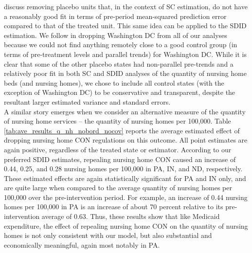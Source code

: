 \documentclass[../Main.tex]{subfiles}
\begin{document}
\indent \citet{abadie2010synthetic} discuss removing placebo units that, in the context of SC estimation, do not have a reasonably good fit in terms of pre-period mean-squared prediction error compared to that of the treated unit. This same idea can be applied to the SDID estimation. We follow \citet{abadie2010synthetic} in dropping Washington DC from all of our analyses because we could not find anything remotely close to a good control group (in terms of pre-treatment levels and parallel trends) for Washington DC. While it is clear that some of the other placebo states had non-parallel pre-trends and a relatively poor fit in both SC and SDID analyses of the quantity of nursing home beds (and nursing homes), we chose to include all control states (with the exception of Washington DC) to be conservative and transparent, despite the resultant larger estimated variance and standard errors.\\
\indent A similar story emerges when we consider an alternative measure of the quantity of nursing home services -- the quantity of nursing homes per 100,000. Table \ref{tab:ave_results_q_nh_nobord_nocov} reports the average estimated effect of dropping nursing home CON regulations on this outcome. All point estimates are again positive, regardless of the treated state or estimator. According to our preferred SDID estimates, repealing nursing home CON caused an increase of 0.44, 0.25, and 0.28 nursing homes per 100,000 in PA, IN, and ND, respectively. These estimated effects are again statistically significant for PA and IN only, and are quite large when compared to the average quantity of nursing homes per 100,000 over the pre-intervention period. For example, an increase of 0.44 nursing homes per 100,000 in PA is an increase of about 70 percent relative to its pre-intervention average of 0.63. Thus, these results show that like Medicaid expenditure, the effect of repealing nursing home CON on the quantity of nursing homes is not only consistent with our model, but also substantial and economically meaningful, again most notably in PA. \\
\end{document}
